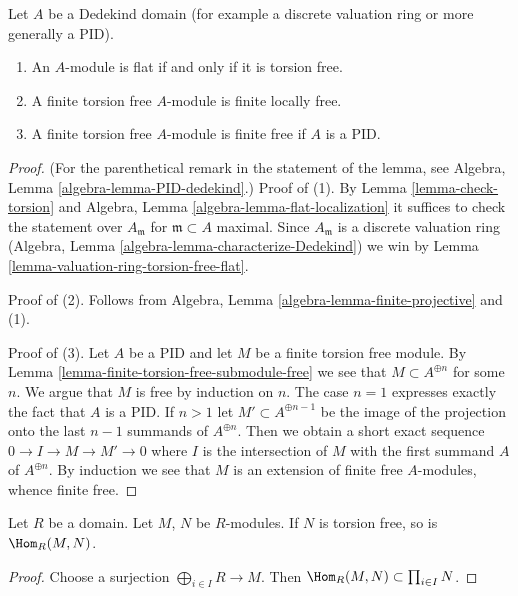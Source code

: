 \begin{lemma}
\label{lemma-dedekind-torsion-free-flat}
Let $A$ be a Dedekind domain (for example a discrete valuation ring
or more generally a PID).
\begin{enumerate}
\item An $A$-module is flat if and only if it is torsion free.
\item A finite torsion free $A$-module is finite locally free.
\item A finite torsion free $A$-module is finite free if
$A$ is a PID.
\end{enumerate}
\end{lemma}

\begin{proof}
(For the parenthetical remark in the statement of the lemma, see
Algebra, Lemma \ref{algebra-lemma-PID-dedekind}.) Proof of (1).
By Lemma \ref{lemma-check-torsion}
and Algebra, Lemma \ref{algebra-lemma-flat-localization}
it suffices to check the statement over $A_\mathfrak m$
for $\mathfrak m \subset A$ maximal. Since $A_\mathfrak m$
is a discrete valuation ring
(Algebra, Lemma \ref{algebra-lemma-characterize-Dedekind})
we win by Lemma \ref{lemma-valuation-ring-torsion-free-flat}.

\medskip\noindent
Proof of (2). Follows from
Algebra, Lemma \ref{algebra-lemma-finite-projective}
and (1).

\medskip\noindent
Proof of (3). Let $A$ be a PID and let $M$ be a finite
torsion free module. By Lemma \ref{lemma-finite-torsion-free-submodule-free}
we see that $M \subset A^{\oplus n}$ for some $n$. We argue that
$M$ is free by induction on $n$. The case $n = 1$ expresses exactly the
fact that $A$ is a PID. If $n > 1$ let $M' \subset A^{\oplus n - 1}$
be the image of the projection onto the last $n - 1$ summands of
$A^{\oplus n}$. Then we obtain a short exact sequence
$0 \to I \to M \to M' \to 0$ where $I$ is the intersection of $M$
with the first summand $A$ of $A^{\oplus n}$. By induction we
see that $M$ is an extension of finite free $A$-modules, whence
finite free.
\end{proof}

\begin{lemma}
\label{lemma-hom-into-torsion-free}
Let $R$ be a domain. Let $M$, $N$ be $R$-modules.
If $N$ is torsion free, so is $\Hom_R(M, N)$.
\end{lemma}

\begin{proof}
Choose a surjection $\bigoplus_{i \in I} R \to M$.
Then $\Hom_R(M, N) \subset \prod_{i \in I} N$.
\end{proof}




